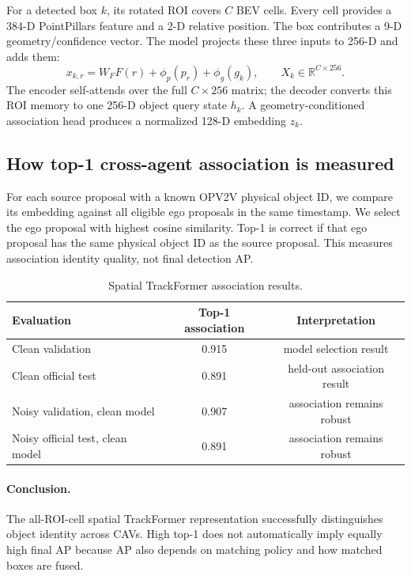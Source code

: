 \documentclass[11pt]{article}
\begin{document}
For a detected box $k$, its rotated ROI covers $C$ BEV cells. Every cell provides a 384-D PointPillars feature and a 2-D relative position. The box contributes a 9-D geometry/confidence vector. The model projects these three inputs to 256-D and adds them:
\begin{equation}
x_{k,r}=W_FF(r)+\phi_p(p_r)+\phi_g(g_k),\qquad X_k\in\mathbb{R}^{C\times256}.
\end{equation}
The encoder self-attends over the full $C\times256$ matrix; the decoder converts this ROI memory to one 256-D object query state $h_k$. A geometry-conditioned association head produces a normalized 128-D embedding $z_k$.

\subsection{How top-1 cross-agent association is measured}

For each source proposal with a known OPV2V physical object ID, we compare its embedding against all eligible ego proposals in the same timestamp. We select the ego proposal with highest cosine similarity. Top-1 is correct if that ego proposal has the same physical object ID as the source proposal. This measures association identity quality, not final detection AP.

\begin{table}[h]
\centering
\caption{Spatial TrackFormer association results.}
\begin{tabular}{lcc}
\toprule
Evaluation & Top-1 association & Interpretation\\
\midrule
Clean validation & 0.915 & model selection result\\
Clean official test & 0.891 & held-out association result\\
Noisy validation, clean model & 0.907 & association remains robust\\
Noisy official test, clean model & 0.891 & association remains robust\\
\bottomrule
\end{tabular}
\end{table}

\paragraph{Conclusion.} The all-ROI-cell spatial TrackFormer representation successfully distinguishes object identity across CAVs. High top-1 does not automatically imply equally high final AP because AP also depends on matching policy and how matched boxes are fused.
\end{document}
